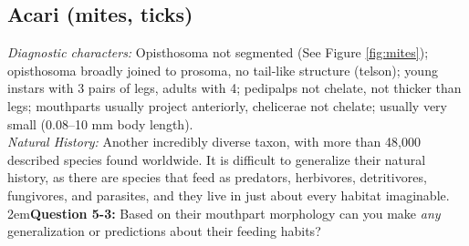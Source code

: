 \documentclass[letterpaper, 11pt]{article}
\begin{document}
\subsection{Acari (mites, ticks)}
\noindent{}\textit{Diagnostic characters:} Opisthosoma not segmented (See Figure \ref{fig:mites}); opisthosoma broadly joined to prosoma, no tail-like structure (telson); young instars with 3 pairs of legs, adults with 4; pedipalps not chelate, not thicker than legs; mouthparts usually project anteriorly, chelicerae not chelate; usually very small (0.08--10 mm body length).\\

\noindent{}\textit{Natural History:} Another incredibly diverse taxon, with more than 48,000 described species found worldwide. It is difficult to generalize their natural history, as there are species that feed as predators, herbivores, detritivores, fungivores, and parasites, and they live in just about every habitat imaginable.  \\

\hangindent2em\textbf{Question 5-3:} Based on their mouthpart morphology can you make \textit{any} generalization or predictions about their feeding habits?\\
\end{document}
